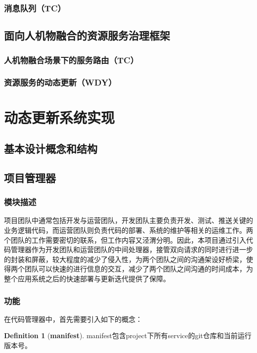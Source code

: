\documentclass[12pt,a4paper]{article}
\theoremstyle{definition}
\newtheorem{definition}{Definition}[section]
\begin{document}
\subsubsection{消息队列（TC）}

\subsection{面向人机物融合的资源服务治理框架}
\subsubsection{人机物融合场景下的服务路由（TC）}
\subsubsection{资源服务的动态更新（WDY）}

\section{动态更新系统实现}\label{section:MsDymEvo}

\subsection{基本设计概念和结构}

\subsection{项目管理器}
\subsubsection{模块描述}
项目团队中通常包括开发与运营团队，开发团队主要负责开发、测试、推送关键的业务逻辑代码，而运营团队则负责代码的部署、系统的维护等相关的运维工作。两个团队的工作需要密切的联系，但工作内容又泾渭分明。因此，本项目通过引入代码管理器作为开发团队和运营团队的中间处理器，接管双向请求的同时进行进一步的封装和屏蔽，较大程度的减少了侵入性，为两个团队之间的沟通架设好桥梁，使得两个团队可以快速的进行信息的交互，减少了两个团队之间沟通的时间成本，为整个应用系统之后的快速部署与更新迭代提供了保障。
\subsubsection{功能}
在代码管理器中，首先需要引入如下的概念：
\theoremstyle{definition}
\begin{definition}[\textbf{manifest}]
\label{definition:manifest}
manifest包含project下所有service的git仓库和当前运行版本号。
\end{definition}
\end{document}
